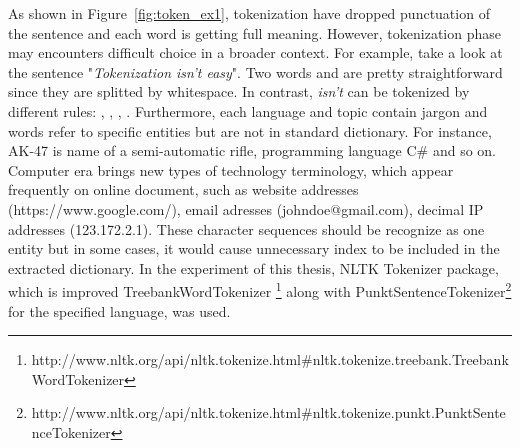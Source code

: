 As shown in Figure~\ref{fig:token_ex1}, tokenization have dropped punctuation of the sentence and each word is getting full meaning. However, tokenization phase may encounters difficult choice in a broader context. For example, take a look at the sentence "\textit{Tokenization isn't easy}". Two words  and  are pretty straightforward since they are splitted by whitespace. In contrast, \textit{isn't} can be tokenized by different rules: , ,  ,  . Furthermore, each language and topic contain jargon and words refer to specific entities but are not in standard dictionary. For instance, AK-47 is name of a semi-automatic rifle, programming language C\# and so on. Computer era brings new types of technology terminology, which appear frequently on online document, such as website addresses (https://www.google.com/), email adresses (johndoe@gmail.com), decimal IP addresses (123.172.2.1). These character sequences should be recognize as one entity but in some cases, it would cause unnecessary index to be included in the extracted dictionary. In the experiment of this thesis, NLTK Tokenizer package, which is improved TreebankWordTokenizer \footnote{http://www.nltk.org/api/nltk.tokenize.html\#nltk.tokenize.treebank.TreebankWordTokenizer} along with PunktSentenceTokenizer\footnote{http://www.nltk.org/api/nltk.tokenize.html\#nltk.tokenize.punkt.PunktSentenceTokenizer} for the specified language, was used.\\

